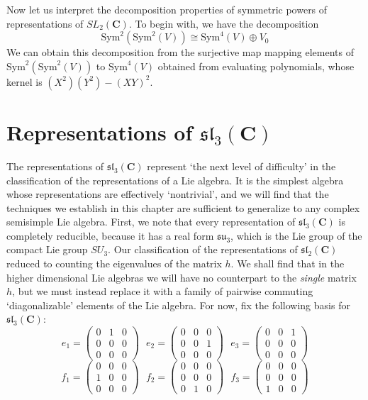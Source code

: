 Now let us interpret the decomposition properties of symmetric powers of representations of $SL_2(\mathbf{C})$. To begin with, we have the decomposition
%
\[ \text{Sym}^2(\text{Sym}^2(V)) \cong \text{Sym}^4(V) \oplus V_0 \]
%
We can obtain this decomposition from the surjective map mapping elements of $\text{Sym}^2(\text{Sym}^2(V))$ to $\text{Sym}^4(V)$ obtained from evaluating polynomials, whose kernel is $(X^2)(Y^2) - (XY)^2$.

\section{Representations of $\mathfrak{sl}_3(\mathbf{C})$}

The representations of $\mathfrak{sl}_3(\mathbf{C})$ represent `the next level of difficulty' in the classification of the representations of a Lie algebra. It is the simplest algebra whose representations are effectively `nontrivial', and we will find that the techniques we establish in this chapter are sufficient to generalize to any complex semisimple Lie algebra. First, we note that every representation of $\mathfrak{sl}_3(\mathbf{C})$ is completely reducible, because it has a real form $\mathfrak{su}_3$, which is the Lie group of the compact Lie group $SU_3$. Our classification of the representations of $\mathfrak{sl}_2(\mathbf{C})$ reduced to counting the eigenvalues of the matrix $h$. We shall find that in the higher dimensional Lie algebras we will have no counterpart to the {\it single} matrix $h$, but we must instead replace it with a family of pairwise commuting `diagonalizable' elements of the Lie algebra. For now, fix the following basis for $\mathfrak{sl}_3(\mathbf{C})$:
%
\[  e_1 = \begin{pmatrix} 0 & 1 & 0 \\ 0 & 0 & 0 \\ 0 & 0 & 0 \end{pmatrix}\ \ \ e_2 = \begin{pmatrix} 0 & 0 & 0 \\ 0 & 0 & 1 \\ 0 & 0 & 0 \end{pmatrix}\ \ \ e_3 = \begin{pmatrix} 0 & 0 & 1 \\ 0 & 0 & 0 \\ 0 & 0 & 0 \end{pmatrix} \]
\[ f_1 = \begin{pmatrix} 0 & 0 & 0 \\ 1 & 0 & 0 \\ 0 & 0 & 0 \end{pmatrix}\ \ \ f_2 = \begin{pmatrix} 0 & 0 & 0 \\ 0 & 0 & 0 \\ 0 & 1 & 0 \end{pmatrix}\ \ \ f_3 = \begin{pmatrix} 0 & 0 & 0 \\ 0 & 0 & 0 \\ 1 & 0 & 0 \end{pmatrix} \]
